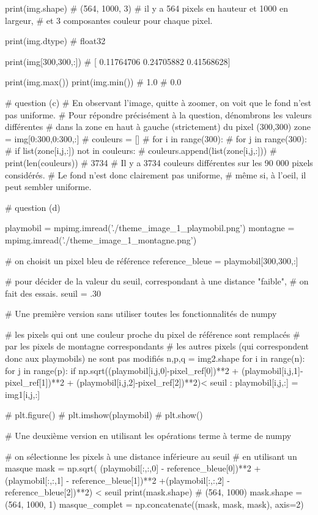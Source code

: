 \documentclass[10pt,fleqn]{article} %
\begin{document}
\begin{multicols}{2}
\begin{corrige}
\begin{python}
print(img.shape)
# (564, 1000, 3)
# il y a 564 pixels en hauteur et 1000 en largeur,
# et 3 composantes couleur pour chaque pixel.
 
print(img.dtype)
# float32

print(img[300,300,:])
# [ 0.11764706  0.24705882  0.41568628]

print(img.max())
print(img.min())
# 1.0
# 0.0

# question (c)
# En observant l'image, quitte à zoomer, on voit que le fond n'est pas uniforme.
# Pour répondre précisément à la question, dénombrons les valeurs différentes
# dans la zone en haut à gauche (strictement) du pixel (300,300)
zone = img[0:300,0:300,:]
# couleurs = []
# for i in range(300):
#     for j in range(300):
#         if list(zone[i,j,:]) not in couleurs:
#             couleurs.append(list(zone[i,j,:]))
# print(len(couleurs))
# 3734
# Il y a 3734 couleurs différentes sur les 90 000 pixels considérés.
# Le fond n'est donc clairement pas uniforme,
# même si, à l'oeil, il peut sembler uniforme.

# question (d)

playmobil = mpimg.imread('./theme_image_1_playmobil.png')  
montagne = mpimg.imread('./theme_image_1_montagne.png')

# on choisit un pixel bleu de référence
reference_bleue = playmobil[300,300,:]

# pour décider de la valeur du seuil, correspondant à une distance "faible",
# on fait des essais. 
seuil = .30

# Une première version sans utiliser toutes les fonctionnalités de numpy

# les pixels qui ont une couleur proche du pixel de référence sont remplacés
# par les pixels de montagne correspondants
# les autres pixels (qui correspondent donc aux playmobils) ne sont pas modifiés
n,p,q = img2.shape
for i in range(n):
    for j in range(p):
        if np.sqrt((playmobil[i,j,0]-pixel_ref[0])**2 + (playmobil[i,j,1]-pixel_ref[1])**2
                   + (playmobil[i,j,2]-pixel_ref[2])**2)< seuil :
            playmobil[i,j,:] = img1[i,j,:]

# plt.figure()
# plt.imshow(playmobil)
# plt.show()

# Une deuxième version en utilisant les opérations terme à terme de numpy

# on sélectionne les pixels à une distance inférieure au seuil
# en utilisant un masque
mask = np.sqrt( (playmobil[:,:,0] - reference_bleue[0])**2
               +(playmobil[:,:,1] - reference_bleue[1])**2
               +(playmobil[:,:,2] - reference_bleue[2])**2) < seuil
print(mask.shape)
# (564, 1000)
mask.shape = (564, 1000, 1)
masque_complet = np.concatenate((mask, mask, mask), axis=2)


\end{python}
\end{corrige}
\end{multicols}
\end{document}

